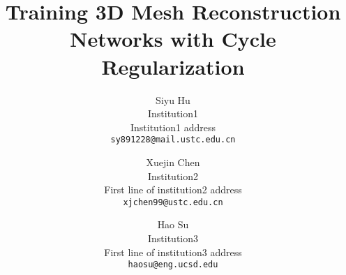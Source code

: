 \documentclass[10pt,twocolumn,letterpaper]{article}
\begin{document}
\title{Training 3D Mesh Reconstruction Networks with Cycle Regularization}

\author{Siyu Hu\\
Institution1\\
Institution1 address\\
{\tt\small sy891228@mail.ustc.edu.cn}
\and
Xuejin Chen\\
Institution2\\
First line of institution2 address\\
{\tt\small xjchen99@ustc.edu.cn}
\and 
Hao Su\\
Institution3\\
First line of institution3 address\\
{\tt\small haosu@eng.ucsd.edu}
}

\maketitle
 





{\small


}

%
\end{document}
